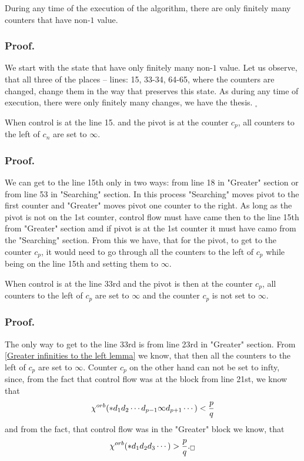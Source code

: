 \begin{lemma}
During any time of the execution of the algorithm, there are only finitely many counters 
that have non-$1$ value.
\end{lemma}
\subsubsection{Proof.}
We start with the state that have only finitely many non-$1$ value. Let us observe, that 
all three of the places -- lines: 15, 33-34, 64-65, 
where the counters are changed, change them in the way 
that preserves this state. As during any time of execution, there were only finitely many 
changes, we have the thesis. $_\square$

\begin{lemma}\label{Greater infinities to the left lemma}
When control is at the line 15. and the pivot is at the counter $c_p$, all counters 
to the left of $c_n$ are set to $\infty$. 
\end{lemma}
\subsubsection{Proof.}
We can get to the line 15th only in two ways: from line 18 in "Greater" section or from line 53 
in "Searching" section. 
In this process "Searching" moves pivot to the first counter and  
"Greater" moves pivot one counter to the right. 
As long as the pivot is not on the 1st counter, control flow must have came then to the line 15th 
from "Greater" section amd if pivot is at the 1st counter it must have camo from the 
"Searching" section. From this we have,  
that for the pivot, to get to the counter $c_p$, it would need to go through all 
the counters to the left of $c_p$ while being on the line 15th and 
setting them to $\infty$. 
\begin{lemma}\label{Searching infinities to the left lemma}
When control is at the line 33rd and the pivot is then at the counter $c_p$, all counters 
to the left of $c_p$ are set to $\infty$ and the counter $c_p$ is not set to $\infty$. 
\end{lemma}
\subsubsection{Proof.}
The only way to get to the line 33rd is from line 23rd in "Greater" section. 
From \ref{Greater infinities to the left lemma} we know, that then all the counters to the left 
of $c_p$ are set to $\infty$. Counter $c_p$ on the other hand can not be set to infty, 
since, from the fact that control flow was at the block from line 21st, we know that
\begin{equation}
{\chi^{orb}(*d_1d_2\cdots d_{p-1}\infty d_{p+1}\cdots)} < \frac{p}{q}
\end{equation}
and from the fact, that control flow was in the "Greater" block we know, that 
\begin{equation}
{\chi^{orb}(*d_1d_2d_3\cdots )} > \frac{p}{q}._\square
\end{equation}


